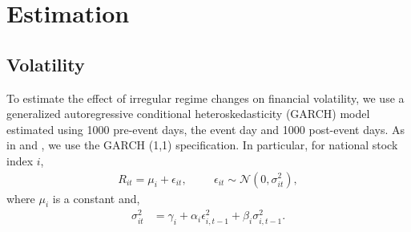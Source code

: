 \documentclass[12pt,final,fleqn]{article}
\theoremstyle{plain}
\begin{document}





\section{Estimation} \label{sec: estimation}

\subsection{Volatility} \label{subsec: Volatility}

To estimate the effect of irregular regime changes on financial volatility, we use a generalized autoregressive conditional heteroskedasticity (GARCH) model estimated using 1000 pre-event days, the event day and 1000 post-event days. As in \citet{jensen2005market} and \citet{leblang2005government}, we use the GARCH (1,1) specification. In particular, for national stock index $i$,
\begin{align*}
R_{it}=\mu_i + \epsilon_{it},\hspace{1cm} \epsilon_{it}\sim \mathcal{N}\left(0,\sigma_{it}^2\right),
\end{align*}
where $\mu_i$ is a constant and,
\begin{align*}
\sigma_{it}^2&=\gamma_{i}+\alpha_{i}\epsilon_{i,t-1}^2+\beta_{i}\sigma_{i,t-1}^2.
\end{align*}
\end{document}
